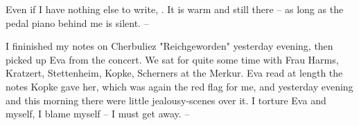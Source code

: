 
Even if I have nothing else to write, . It is warm and still there -- as long as the pedal piano behind me is silent. --

I fininished my notes on Cherbuliez "Reichgeworden" yesterday evening, then picked up Eva from the concert. We sat for quite some time with Frau Harms, Kratzert, Stettenheim, Kopke, Scherners at the Merkur. Eva read at length the notes Kopke gave her, which was again the red flag for me, and yesterday evening and this morning there were little jealousy-scenes over it. I torture Eva and myself, I blame myself -- I must get away. -- \missing